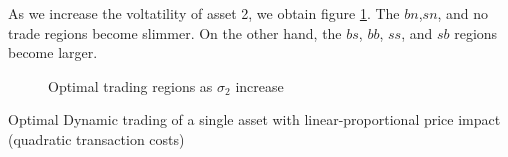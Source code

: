 \documentclass[10pt]{article}
\newenvironment{exercise}[2][Exercise]{\begin{trivlist}
  \item[\hskip \labelsep {\bfseries #1}\hskip \labelsep {\bfseries #2.}]}{\end{trivlist}}
\begin{document}
As we increase the voltatility of asset 2, we obtain figure \ref{ex2_3}. The $bn$,$sn$, and no trade regions become slimmer. On the other hand, the $bs$, $bb$, $ss$, and $sb$ regions become larger.

\begin{figure}[h]
    \centering
    \caption{Optimal trading regions as $\sigma_2$ increase}
    \label{ex2_3}   
\end{figure}

\newpage

\begin{exercise}{3}{Optimal Dynamic trading of a single asset with linear-proportional price impact (quadratic transaction costs)}
\end{exercise}
   
\end{document}

